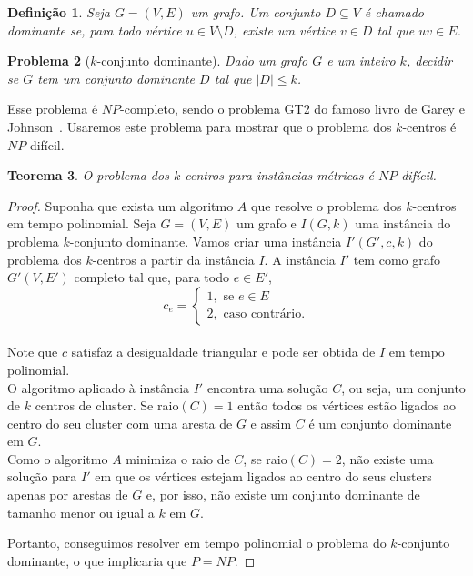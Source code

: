 \documentclass[12pt]{article}
\newtheorem{theorem}{Teorema}[section]
\newtheorem{definition}[theorem]{Definição}
\newtheorem{problem}[theorem]{Problema}
\newcommand{\NP}{\mathit{NP}}
\begin{document}
\begin{definition}
    Seja $G = (V,E)$ um grafo. Um conjunto $D \subseteq V$ é chamado \emph{dominante} se, para todo vértice $u \in V \setminus D$, existe um vértice $v \in D$ tal que $uv \in E$.
\end{definition}

\begin{problem}[$k$-conjunto dominante]
    Dado um grafo $G$ e um inteiro $k$, decidir se $G$ tem um conjunto dominante $D$ tal que $|D| \leq k$.      
\end{problem}
Esse problema é $\NP$-completo, sendo o problema GT2 do famoso livro de Garey e Johnson~\cite{garey1979computers}. Usaremos este problema para mostrar que o problema dos $k$-centros é $\NP$-difícil.

\begin{theorem}\label{theorem:2.3}
    O problema dos $k$-centros para instâncias métricas é $\NP$-difícil.
\end{theorem}

\begin{proof}
    Suponha que exista um algoritmo $A$ que resolve o problema dos $k$-centros em tempo polinomial. Seja $G = (V,E)$ um grafo e $I(G,k)$ uma instância do problema $k$-conjunto dominante. Vamos criar uma instância $I'(G',c,k)$ do problema dos $k$-centros a partir da instância $I$. A instância $I'$ tem como grafo $G'(V,E')$ completo tal que, para todo $e \in E'$, \\
    \[
    c_e = \begin{cases}
            1, \text{ se } e \in E \\
            2, \text{ caso contrário.} 
            \end{cases}\]\\
    Note que $c$ satisfaz a desigualdade triangular e pode ser obtida de $I$ em tempo polinomial.\\
    O algoritmo aplicado à instância $I'$ encontra uma solução $C$, ou seja, um conjunto de $k$ centros de cluster. Se raio$(C)=1$ então todos os vértices estão ligados ao centro do seu cluster com uma aresta de $G$ e assim $C$ é um conjunto dominante em $G$. \\
    Como o algoritmo $A$ minimiza o raio de $C$, se raio$(C)=2$, não existe uma solução para $I'$ em que os vértices estejam ligados ao centro do seus clusters apenas por arestas de $G$ e, por isso, não existe um conjunto dominante de tamanho menor ou igual a $k$ em $G$.

    Portanto, conseguimos resolver em tempo polinomial o problema do $k$-conjunto dominante, o que implicaria que $P = \NP$.
\end{proof}
\end{document}
